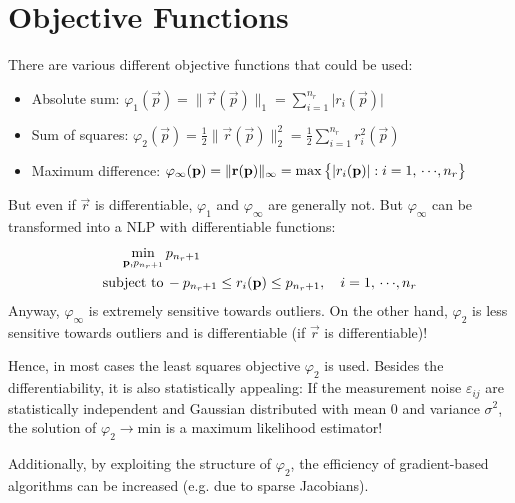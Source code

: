	\section{Objective Functions}
		There are various different objective functions that could be used:
		\begin{itemize}
			\item Absolute sum: \tabto{4cm} \( \varphi_1(\vec{p}) = \lVert \vec{r}(\vec{p}) \rVert_1 = \sum_{i = 1}^{n_r} \lvert r_i(\vec{p}) \rvert \)
			\item Sum of squares: \tabto{4cm} \( \varphi_2(\vec{p}) = \frac{1}{2} \lVert \vec{r}(\vec{p}) \rVert_2^2 = \frac{1}{2} \sum_{i = 1}^{n_r} r_i^2(\vec{p}) \)
			\item Maximum difference: \tabto{4cm} \( \varphi_\infty(\boldsymbol{\mathrm{p}}) = \lVert \boldsymbol{\mathrm{r}}(\boldsymbol{\mathrm{p}}) \rVert_\infty = \max\big\{ \lvert r_i(\boldsymbol{\mathrm{p}}) \rvert : i = 1,\,\cdots\!,n_r \big\} \)
		\end{itemize}
		But even if \(\vec{r}\) is differentiable, \(\varphi_1\) and \(\varphi_\infty\) are generally not. But \(\varphi_\infty\) can be transformed into a NLP with differentiable functions:
		\begin{align*}
			\min_{\boldsymbol{\mathrm{p}}, p_{n_r + 1}} &\, p_{n_r + 1} \\
			\mathrm{subject~to} &\,
				-p_{n_r + 1} \leq r_i(\boldsymbol{\mathrm{p}}) \leq p_{n_r + 1},\quad i = 1,\,\cdots\!,n_r
		\end{align*}
		Anyway, \(\varphi_\infty\) is extremely sensitive towards outliers. On the other hand, \(\varphi_2\) is less sensitive towards outliers and is differentiable (if \(\vec{r}\) is differentiable)!
		
		Hence, in most cases the least squares objective \(\varphi_2\) is used. Besides the differentiability, it is also statistically appealing: If the measurement noise \(\varepsilon_{ij}\) are statistically independent and Gaussian distributed with mean \(0\) and variance \(\sigma^2\), the solution of \( \varphi_2 \to \mathrm{min} \) is a maximum likelihood estimator!
		
		Additionally, by exploiting the structure of \(\varphi_2\), the efficiency of gradient-based algorithms can be increased (e.g. due to sparse Jacobians).

